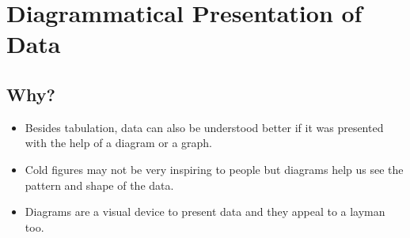 \documentclass[
10pt, %
a4paper, %
]{report}
\begin{document}
\section{Diagrammatical Presentation of Data}

\subsection{Why?}
\begin{itemize}
\item Besides tabulation, data can also be understood better if it was presented with the help of a diagram or a graph.
\item Cold figures may not be very inspiring to people but diagrams help us see the pattern and shape of the data.
\item Diagrams are a visual device to present data and they appeal to a layman too.
\end{itemize}
\end{document}
